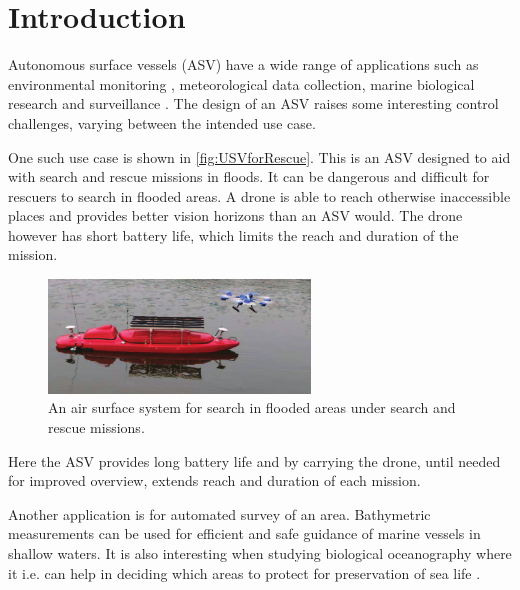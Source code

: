 \chapter{Introduction}

Autonomous surface vessels (ASV) have a wide range of applications such as environmental monitoring \cite[p. 745]{MAHsieh}, meteorological data collection, marine biological research and surveillance \cite[p. 8-10]{FFahimi}.
The design of an ASV raises some interesting control challenges, varying between the intended use case.

One such use case is shown in \autoref{fig:USVforRescue}. 
This is an ASV designed to aid with search and rescue missions in floods. 
It can be dangerous and difficult for rescuers to search in flooded areas. 
A drone is able to reach otherwise inaccessible places and provides better vision horizons than an ASV would. 
The drone however has short battery life, which limits the reach and duration of the mission.
%
\begin{figure}[H]
  \vspace{3mm}
  \includegraphics[width=0.62\textwidth]{figures/USVforRescue.pdf}
  \caption{An air surface system for search in flooded areas under search and rescue missions. \cite{JZhang}}
  \label{fig:USVforRescue}
\end{figure}
\vspace{-6mm}
%
Here the ASV provides long battery life and by carrying the drone, until needed for improved overview, extends reach and duration of each mission. \cite{JZhang}



Another application is for automated survey of an area.
Bathymetric measurements can be used for efficient and safe guidance of marine vessels in shallow waters. 
It is also interesting when studying biological oceanography where it i.e. can help in deciding which areas to protect for preservation of sea life \cite{NOService}. 


